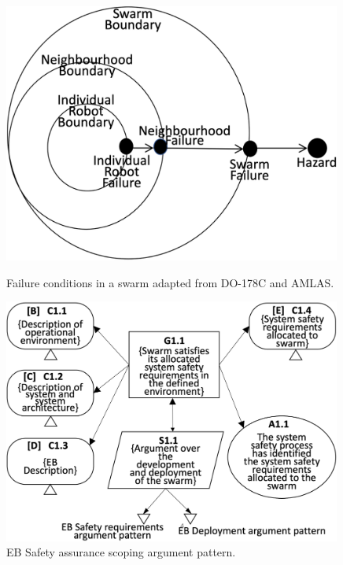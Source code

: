 \documentclass[runningheads]{llncs}
\begin{document}
\begin{figure}
	\vspace{-4ex}
	\centering
	\begin{minipage}{.5\textwidth}
		\centering
		\includegraphics[width=0.99\textwidth]{figures/stage1-failureevents-v3.png}
		\vspace{-2ex}
		\caption{Failure conditions in a swarm adapted from DO-178C and AMLAS.}
		\label{failure-events}
	\end{minipage}
	\begin{minipage}{.45\textwidth}
		\centering
		\includegraphics[width=0.99\textwidth]{figures/stage1-argumentpattern-v3.png}
		\vspace{-2ex}
		\caption{EB Safety assurance scoping argument pattern.}
		\label{stage1-ap}
	\end{minipage}	
	\vspace{-5ex}
\end{figure}
\end{document}
